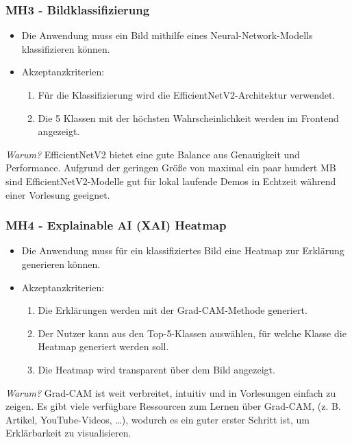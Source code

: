 \subsubsection{MH3 - Bildklassifizierung}
\begin{itemize}
    \item Die Anwendung muss ein Bild mithilfe eines Neural-Network-Modells klassifizieren können.
    \item Akzeptanzkriterien:
    \begin{enumerate}
        \item Für die Klassifizierung wird die EfficientNetV2-Architektur verwendet.
        \item Die 5 Klassen mit der höchsten Wahrscheinlichkeit werden im Frontend angezeigt.
    \end{enumerate}
\end{itemize}
\textit{Warum?} EfficientNetV2 bietet eine gute Balance aus Genauigkeit und Performance.
Aufgrund der geringen Größe von maximal ein paar hundert MB sind EfficientNetV2-Modelle gut für lokal laufende Demos in Echtzeit während einer Vorlesung geeignet.

\subsubsection{MH4 - Explainable AI (XAI) Heatmap}
\begin{itemize}
    \item Die Anwendung muss für ein klassifiziertes Bild eine Heatmap zur Erklärung generieren können.
    \item Akzeptanzkriterien:
    \begin{enumerate}
        \item Die Erklärungen werden mit der Grad-CAM-Methode generiert.
        \item Der Nutzer kann aus den Top-5-Klassen auswählen, für welche Klasse die Heatmap generiert werden soll.
        \item Die Heatmap wird transparent über dem Bild angezeigt.
    \end{enumerate}
\end{itemize}
\textit{Warum?} Grad-CAM ist weit verbreitet, intuitiv und in Vorlesungen einfach zu zeigen.
Es gibt viele verfügbare Ressourcen zum Lernen über Grad-CAM, (z. B. Artikel, YouTube-Videos, \ldots), wodurch es ein guter erster Schritt ist, um Erklärbarkeit zu visualisieren. 

